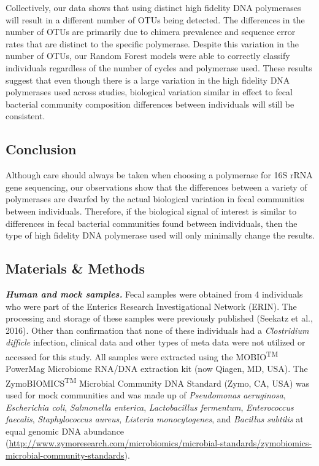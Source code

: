 \documentclass[11pt,]{article}
\begin{document}
Collectively, our data shows that using distinct high fidelity DNA
polymerases will result in a different number of OTUs being detected.
The differences in the number of OTUs are primarily due to chimera
prevalence and sequence error rates that are distinct to the specific
polymerase. Despite this variation in the number of OTUs, our Random
Forest models were able to correctly classify individuals regardless of
the number of cycles and polymerase used. These results suggest that
even though there is a large variation in the high fidelity DNA
polymerases used across studies, biological variation similar in effect
to fecal bacterial community composition differences between individuals
will still be consistent.

\newpage

\subsection{Conclusion}\label{conclusion}

Although care should always be taken when choosing a polymerase for 16S
rRNA gene sequencing, our observations show that the differences between
a variety of polymerases are dwarfed by the actual biological variation
in fecal communities between individuals. Therefore, if the biological
signal of interest is similar to differences in fecal bacterial
communities found between individuals, then the type of high fidelity
DNA polymerase used will only minimally change the results.

\newpage

\subsection{Materials \& Methods}\label{materials-methods}

\textbf{\emph{Human and mock samples.}} Fecal samples were obtained from
4 individuals who were part of the Enterics Research Investigational
Network (ERIN). The processing and storage of these samples were
previously published (Seekatz et al., 2016). Other than confirmation
that none of these individuals had a \emph{Clostridium difficle}
infection, clinical data and other types of meta data were not utilized
or accessed for this study. All samples were extracted using the
MOBIO\textsuperscript{TM} PowerMag Microbiome RNA/DNA extraction kit
(now Qiagen, MD, USA). The ZymoBIOMICS\textsuperscript{TM} Microbial
Community DNA Standard (Zymo, CA, USA) was used for mock communities and
was made up of \emph{Pseudomonas aeruginosa}, \emph{Escherichia coli},
\emph{Salmonella enterica}, \emph{Lactobacillus fermentum},
\emph{Enterococcus faecalis}, \emph{Staphylococcus aureus},
\emph{Listeria monocytogenes}, and \emph{Bacillus subtilis} at equal
genomic DNA abundance
(\url{http://www.zymoresearch.com/microbiomics/microbial-standards/zymobiomics-microbial-community-standards}).
\end{document}
